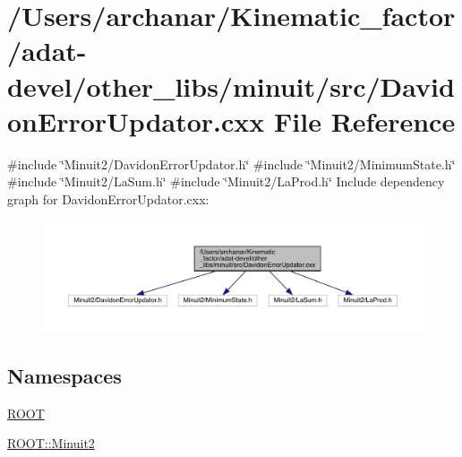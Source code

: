\hypertarget{adat-devel_2other__libs_2minuit_2src_2DavidonErrorUpdator_8cxx}{}\section{/\+Users/archanar/\+Kinematic\+\_\+factor/adat-\/devel/other\+\_\+libs/minuit/src/\+Davidon\+Error\+Updator.cxx File Reference}
\label{adat-devel_2other__libs_2minuit_2src_2DavidonErrorUpdator_8cxx}
{\ttfamily \#include \char`\"{}Minuit2/\+Davidon\+Error\+Updator.\+h\char`\"{}}\newline
{\ttfamily \#include \char`\"{}Minuit2/\+Minimum\+State.\+h\char`\"{}}\newline
{\ttfamily \#include \char`\"{}Minuit2/\+La\+Sum.\+h\char`\"{}}\newline
{\ttfamily \#include \char`\"{}Minuit2/\+La\+Prod.\+h\char`\"{}}\newline
Include dependency graph for Davidon\+Error\+Updator.\+cxx\+:
\nopagebreak
\begin{figure}[H]
\begin{center}
\leavevmode
\includegraphics[width=350pt]{d6/d51/adat-devel_2other__libs_2minuit_2src_2DavidonErrorUpdator_8cxx__incl}
\end{center}
\end{figure}
\subsection*{Namespaces}
\begin{DoxyCompactItemize}
\item 
 \mbox{\hyperlink{namespaceROOT}{R\+O\+OT}}
\item 
 \mbox{\hyperlink{namespaceROOT_1_1Minuit2}{R\+O\+O\+T\+::\+Minuit2}}
\end{DoxyCompactItemize}

